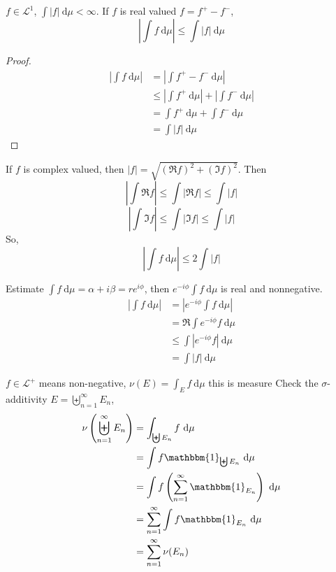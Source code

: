 \begin{lemma}
$f \in \mathcal{L}^1$, $\int |f|\ \mathrm{d}\mu < \infty$. If $f$ is real valued $f = f^+ - f^-$,
\[\left|\int f\ \mathrm{d}\mu \right| \le \int |f| \ \mathrm{d}\mu\]
\end{lemma}
\begin{proof}
  \begin{align*}
    \left|\int f\ \mathrm{d}\mu \right| &= \left|\int f^+ - f^- \ \mathrm{d}\mu \right| \\
    &\le \left|\int f^+ \ \mathrm{d}\mu \right| + \left|\int f^- \ \mathrm{d}\mu \right| \\
    &= \int f^+ \ \mathrm{d}\mu + \int f^- \ \mathrm{d}\mu \\
    &= \int |f| \ \mathrm{d}\mu
  \end{align*}
\end{proof}

\begin{remark}
  If $f$ is complex valued, then $|f| = \sqrt{(\Re f)^2 + (\Im f)^2}$.
  Then
  \[\left|\int \Re f \right|\le \int |\Re f| \le \int |f|\]
  \[\left|\int \Im f \right|\le \int |\Im f| \le \int |f|\]
  So, 
  \[\left|\int f\ \mathrm{d}\mu \right| \le 2\int |f|\]
\end{remark}

\begin{remark}
  Estimate $\int f \ \mathrm{d}\mu = \alpha + i\beta = re^{i \phi}$, then
  $e^{-i\phi} \int f \ \mathrm{d}\mu$ is real and nonnegative.
  \begin{align*}
    \left|\int f \ \mathrm{d}\mu\right| &= \left|e^{-i\phi} \int f \ \mathrm{d}\mu\right| \\
    &= \Re \int e^{-i\phi}f \ \mathrm{d}\mu \\
    &\le \int |e^{-i\phi}f| \ \mathrm{d}\mu \\
    &= \int |f| \ \mathrm{d}\mu
  \end{align*}
\end{remark}

$f \in \mathcal{L}^+$ means non-negative, $\nu(E) = \int_E f \ \mathrm{d}\mu$ this is measure
Check the $\sigma$-additivity
$E = \biguplus_{n=1}^\infty E_n$, 
\begin{align*}
  \nu\left(\biguplus_{n=1}^\infty E_n\right) &= \int_{\biguplus E_n} f \ \mathrm{d}\mu \\
  &= \int f \mathbbm{1}_{\biguplus E_n} \ \mathrm{d}\mu \\
  &= \int f \left(\sum_{n=1}^\infty \mathbbm{1}_{E_n}\right) \ \mathrm{d}\mu \\
  &= \sum_{n=1}^\infty \int f \mathbbm{1}_{E_n} \ \mathrm{d}\mu \\
  &= \sum_{n=1}^\infty \nu(E_n)
\end{align*}

